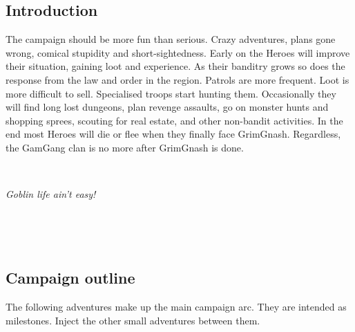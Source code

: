 \subsection*{Introduction}

The campaign should be more fun than serious. Crazy adventures, plans gone wrong, comical stupidity and short-sightedness. Early on the Heroes will improve their situation, gaining loot and experience. As their banditry grows so does the response from the law and order in the region. Patrols are more frequent. Loot is more difficult to sell. Specialised troops start hunting them. Occasionally they will find long lost dungeons, plan revenge assaults, go on monster hunts and shopping sprees, scouting for real estate, and other non-bandit activities. In the end most Heroes will die or flee when they finally face GrimGnash. Regardless, the GamGang clan is no more after GrimGnash is done.


\

\noindent \textit{Goblin life ain't easy!}

\

\


\subsection*{Campaign outline}

The following adventures make up the main campaign arc. They are intended as milestones. Inject the other small adventures between them.

